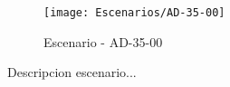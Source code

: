 \begin{figure}[H]
\centering
\texttt{[image: Escenarios/AD-35-00]}
\caption{Escenario - AD-35-00}
\label{fig:AD-35-00}
\end{figure}

Descripcion escenario...
\clearpage

